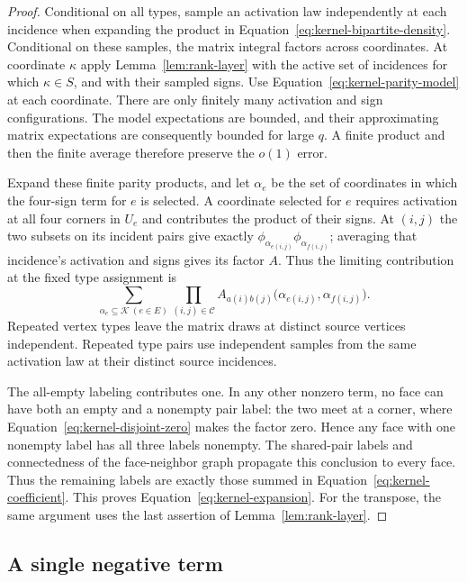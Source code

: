 \begin{proof}
Conditional on all types, sample an activation law independently at
each incidence when expanding the product in
Equation~\eqref{eq:kernel-bipartite-density}. Conditional on these
samples, the matrix integral factors across coordinates. At coordinate
$\kappa$ apply Lemma~\ref{lem:rank-layer} with the active set of
incidences for which $\kappa\in S$, and with their sampled signs.
Use Equation~\eqref{eq:kernel-parity-model} at each coordinate.
There are only finitely many activation and sign configurations.
The model expectations are bounded, and their approximating matrix
expectations are consequently bounded for large $q$. A finite product
and then the finite average therefore preserve the $o(1)$ error.

Expand these finite parity products, and let \(\alpha_e\) be the set
of coordinates in which the four-sign term for \(e\) is selected. A
coordinate selected for \(e\) requires activation at all four
corners in \(U_e\) and contributes the product of their signs.
At $(i,j)$ the two subsets on its incident pairs give exactly
$\phi_{\alpha_{e(i,j)}}\phi_{\alpha_{f(i,j)}}$; averaging that
incidence's activation and signs gives its factor \(A\). Thus the
limiting contribution at the fixed type assignment is
\begin{equation}
 \sum_{\alpha_e\subseteq\mathcal K\ (e\in E)}
 \prod_{(i,j)\in\mathscr C}
 A_{a(i)b(j)}
   \bigl(\alpha_{e(i,j)},\alpha_{f(i,j)}\bigr).
 \label{eq:kernel-unrestricted-labels}
\end{equation}
Repeated vertex types leave the matrix draws at distinct source vertices
independent. Repeated type pairs use independent samples from the same
activation law at their distinct source incidences.

The all-empty labeling contributes one. In any other nonzero term,
no face can have both an empty and a nonempty pair label: the two
meet at a corner, where Equation~\eqref{eq:kernel-disjoint-zero} makes
the factor zero. Hence any face with one nonempty label has all three
labels nonempty. The shared-pair labels and connectedness of the
face-neighbor graph propagate this conclusion to every face. Thus
the remaining labels are exactly those summed in
Equation~\eqref{eq:kernel-coefficient}. This proves
Equation~\eqref{eq:kernel-expansion}. For the transpose, the same
argument uses the last assertion of Lemma~\ref{lem:rank-layer}.
\end{proof}

\subsection{A single negative term}

